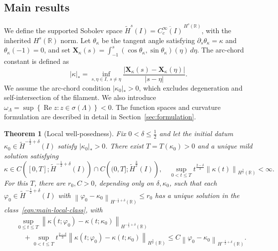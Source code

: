 \documentclass[11pt,reqno]{amsart}
\theoremstyle{plain}
\newtheorem{theorem}{Theorem}[section]
\theoremstyle{definition}
\numberwithin{equation}{section}
\newcommand{\paren}[1]{\left(#1\right)}
\newcommand{\p}{\partial}
\newcommand{\wt}[1]{\widetilde{#1}}
\newcommand{\bm}[1]{\boldsymbol{#1}}
\newcommand{\abs}[1]{\left\lvert #1 \right\rvert}
\newcommand{\norm}[1]{\left\lVert #1 \right\rVert}
\newcommand{\vph}{\varphi}
\newcommand{\R}{\mathbb{R}}
\newcommand{\thi}[1]{\wt H^{#1}(I)}
\newcommand{\hr}[1]{H^{#1}(\R)}
\begin{document}
\subsection{Main results}
We define the supported Sobolev space
$\widetilde H^s(I)=\overline{C_c^\infty(I)}^{\,H^s(\R)}$, with the inherited $H^s(\R)$ norm. Let $\theta_\kappa$ be the tangent angle satisfying
$\p_s\theta_\kappa=\kappa$ and $\theta_\kappa(-1)=0$, and set
$\bm X_\kappa(s)=\int_{-1}^s(\cos\theta_\kappa,\sin\theta_\kappa)(\eta)\,d\eta$.
The arc-chord constant is defined as
\begin{equation}\label{eqn:intro-arc-chord}
    \abs{\kappa}_*
    =\inf_{s,\eta\in I,\ s\ne\eta}
    \frac{\abs{\bm X_\kappa(s)-\bm X_\kappa(\eta)}}{\abs{s-\eta}}.
\end{equation}
We assume the arc-chord condition $\abs{\kappa_0}_*>0$, which excludes degeneration and self-intersection of the filament.
We also introduce $\omega_\Lambda
    =\sup\left\{\operatorname{Re}z:z\in\sigma(\Lambda)\right\}<0.$ 
The function spaces and curvature formulation are described in detail in
Section~\ref{sec:formulation}.

\begin{theorem}[Local well-posedness]\label{thm:main-local}
Fix $0<\delta\le\frac12$ and let the initial datum
$\kappa_0\in\thi{-\frac12+\delta}$ satisfy $\abs{\kappa_0}_*>0$.
There exist $T=T(\kappa_0)>0$ and a unique mild solution satisfying
\begin{equation}\label{eqn:main-local-class}
    \kappa \in C\paren{[0,T];\thi{-\frac12+\delta}} \cap C\paren{(0,T];\thi{\frac32}}, \quad \sup_{0<t\le
    T}t^{\frac{2-\delta}{3}} \norm{\kappa(t)}_{\hr{\frac32}} <\infty.
\end{equation}
For this $T$, there are $r_0,C>0$, depending only on
$\delta,\kappa_0$, such that each $\vph_0\in\thi{-\frac12+\delta}$ with
$\norm{\vph_0-\kappa_0}_{\hr{-\frac12+\delta}}\le r_0$ has a unique solution
in the class~\eqref{eqn:main-local-class}, with
\begin{equation}\label{eqn:main-local-lipschitz}
\begin{aligned}
    &\sup_{0\le t\le T}
    \norm{\kappa(t;\vph_0)-\kappa(t;\kappa_0)}_{
        \hr{-\frac12+\delta}}\\
    &\quad+
    \sup_{0<t\le T}t^{\frac{2-\delta}{3}}
    \norm{\kappa(t;\vph_0)-\kappa(t;\kappa_0)}_{\hr{\frac32}}
    \le C\norm{\vph_0-\kappa_0}_{\hr{-\frac12+\delta}}.
\end{aligned}
\end{equation}
\end{theorem}
\end{document}
